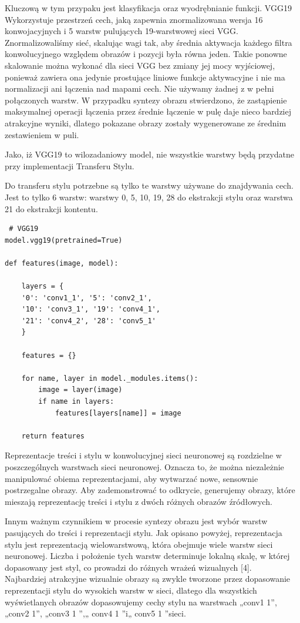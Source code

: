 \documentclass[brudnopis]{xmgr}
\begin{document}
Kluczową w tym przypaku jest klasyfikacja oraz wyodrębnianie funkcji.
VGG19 Wykorzystuje przestrzeń cech, jaką zapewnia znormalizowana wersja 16 konwojacyjnych i 5 warstw pulujących 19-warstwowej sieci VGG. Znormalizowaliśmy sieć, skalując wagi tak, aby średnia aktywacja każdego filtra konwolucyjnego względem obrazów i pozycji była równa jeden. Takie ponowne skalowanie można wykonać dla sieci VGG bez zmiany jej mocy wyjściowej, ponieważ zawiera ona jedynie prostujące liniowe funkcje aktywacyjne i nie ma normalizacji ani łączenia nad mapami cech. Nie używamy żadnej z w pełni połączonych warstw. W przypadku syntezy obrazu stwierdzono, że zastąpienie maksymalnej operacji łączenia przez średnie łączenie w pulę daje nieco bardziej atrakcyjne wyniki, dlatego pokazane obrazy zostały wygenerowane ze średnim zestawieniem w puli. 

Jako, iż VGG19 to wilozadaniowy model, nie wszystkie warstwy będą przydatne przy implementacji Transferu Stylu. 

Do transferu stylu potrzebne są tylko te warstwy używane do znajdywania cech. Jest to tylko 6 warstw: warstwy 0, 5, 10, 19, 28 do ekstrakcji stylu oraz warstwa  21 do ekstrakcji kontentu.

\begin{lstlisting}
 # VGG19
model.vgg19(pretrained=True) 
 
def features(image, model):

	layers = {
	'0': 'conv1_1', '5': 'conv2_1', 
	'10': 'conv3_1', '19': 'conv4_1', 
	'21': 'conv4_2', '28': 'conv5_1'
	}

	features = {}

	for name, layer in model._modules.items():
		image = layer(image)
		if name in layers:
			features[layers[name]] = image

	return features
\end{lstlisting}


Reprezentacje treści i stylu w konwolucyjnej sieci neuronowej są rozdzielne w poszczególnych warstwach sieci neuronowej. Oznacza to, że można niezależnie manipulować obiema reprezentacjami, aby wytwarzać nowe, sensownie postrzegalne obrazy. Aby zademonstrować to odkrycie, generujemy obrazy, które mieszają reprezentację treści i stylu z dwóch różnych obrazów źródłowych.

Innym ważnym czynnikiem w procesie syntezy obrazu jest wybór warstw pasujących do treści i reprezentacji stylu. Jak opisano powyżej, reprezentacja stylu jest reprezentacją wielowarstwową, która obejmuje wiele warstw sieci neuronowej. Liczba i położenie tych warstw determinuje lokalną skalę, w której dopasowany jest styl, co prowadzi do różnych wrażeń wizualnych [4]. 
\\
 Najbardziej atrakcyjne wizualnie obrazy są zwykle tworzone przez dopasowanie reprezentacji stylu do wysokich warstw w sieci, dlatego dla wszystkich wyświetlanych obrazów dopasowujemy cechy stylu na warstwach „conv1 1”, „conv2 1”, „conv3 1 ”,„ conv4 1 ”i„ conv5 1 ”sieci.
\end{document}
